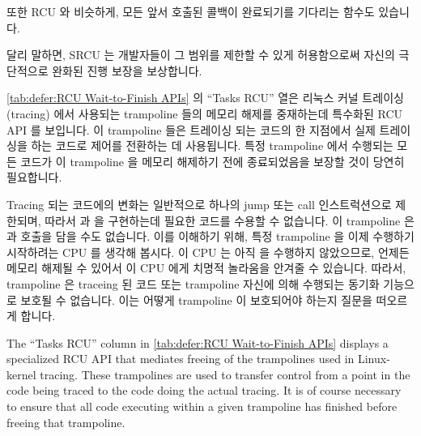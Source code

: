 또한 RCU 와 비슷하게, 모든 앞서 호출된  콜백이 완료되기를
기다리는  함수도 있습니다.

달리 말하면, SRCU 는 개발자들이 그 범위를 제한할 수 있게 허용함으로써 자신의
극단적으로 완화된 진행 보장을 보상합니다.

\cref{tab:defer:RCU Wait-to-Finish APIs} 의 ``Tasks RCU'' 열은 리눅스 커널
트레이싱 (tracing) 에서 사용되는 trampoline 들의 메모리 해제를 중재하는데
특수화된 RCU API 를 보입니다.
이 trampoline 들은 트레이싱 되는 코드의 한 지점에서 실제 트레이싱을 하는 코드로
제어를 전환하는 데 사용됩니다.
특정 trampoline 에서 수행되는 모든 코드가 이 trampoline 을 메모리 해제하기 전에
종료되었음을 보장할 것이 당연히 필요합니다.

Tracing 되는 코드에의 변화는 일반적으로 하나의 jump 또는 call 인스트럭션으로
제한되며, 따라서  과  을 구현하는데
필요한 코드를 수용할 수 없습니다.
이 trampoline 은  과  호출을 담을
수도 없습니다.
이를 이해하기 위해, 특정 trampoline 을 이제 수행하기 시작하려는 CPU 를 생각해
봅시다.
이 CPU 는 아직  을 수행하지 않았으므로, 언제든 메모리
해제될 수 있어서 이 CPU 에게 치명적 놀라움을 안겨줄 수 있습니다.
따라서, trampoline 은 traceing 된 코드 또는 trampoline 자신에 의해 수행되는
동기화 기능으로 보호될 수 없습니다.
이는 어떻게 trampoline 이 보호되어야 하는지 질문을 떠오르게 합니다.

\iffalse

The ``Tasks RCU'' column in
\cref{tab:defer:RCU Wait-to-Finish APIs} displays a specialized
RCU API that mediates freeing of the trampolines used in Linux-kernel
tracing.
These trampolines are used to transfer control from a point in the
code being traced to the code doing the actual tracing.
It is of course necessary to ensure that all code executing within
a given trampoline has finished before freeing that trampoline.


